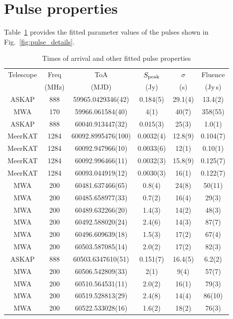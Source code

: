 \documentclass[fleqn,usenatbib]{mnras}
\newcommand{\Fig}{Fig.}
\newcommand{\Tab}{Table}
\begin{document}
\section{Pulse properties}

\Tab~\ref{tbl:toas} provides the fitted parameter values of the pulses shown in \Fig~\ref{fig:pulse_details}.

\begin{table}
  \centering
  \caption{Times of arrival and other fitted pulse properties}
  \label{tbl:toas}
  \begin{tabular}{cccccc}
\hline
Telescope & Freq & ToA & $S_{\rm peak}$ & $\sigma$ & Fluence \\
 & (MHz) & (MJD) & (Jy) & (s) & (Jy\,s) \\
\hline
ASKAP & 888 & 59965.0429346(42) & 0.184(5) & 29.1(4) & 13.4(2) \\
MWA & 170 & 59966.061584(40) & 4(1) & 40(7) & 358(55) \\
ASKAP & 888 & 60040.913447(32) & 0.015(3) & 25(3) & 1.0(1) \\
MeerKAT & 1284 & 60092.8995476(100) & 0.0032(4) & 12.8(9) & 0.104(7) \\
MeerKAT & 1284 & 60092.947966(10) & 0.0033(6) & 12(1) & 0.10(1) \\
MeerKAT & 1284 & 60092.996466(11) & 0.0032(3) & 15.8(9) & 0.125(7) \\
MeerKAT & 1284 & 60093.044919(12) & 0.0030(3) & 16(1) & 0.122(7) \\
MWA & 200 & 60481.637466(65) & 0.8(4) & 24(8) & 50(11) \\
MWA & 200 & 60485.658977(33) & 0.7(2) & 16(4) & 29(3) \\
MWA & 200 & 60489.632266(20) & 1.4(3) & 14(2) & 48(3) \\
MWA & 200 & 60492.588020(24) & 2.4(6) & 14(3) & 87(7) \\
MWA & 200 & 60496.609639(18) & 1.5(3) & 17(2) & 67(4) \\
MWA & 200 & 60503.587085(14) & 2.0(2) & 17(2) & 82(3) \\
ASKAP & 888 & 60503.6347610(51) & 0.151(7) & 16.4(5) & 6.2(2) \\
MWA & 200 & 60506.542809(33) & 2(1) & 9(4) & 57(7) \\
MWA & 200 & 60510.564531(11) & 2.0(2) & 16(1) & 79(3) \\
MWA & 200 & 60519.528813(29) & 2.4(8) & 14(4) & 86(10) \\
MWA & 200 & 60522.533028(16) & 1.6(2) & 18(2) & 76(3) \\

\end{tabular}
\end{table}
\end{document}
